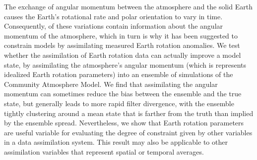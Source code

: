 The exchange of angular momentum between the atmosphere and the solid Earth causes the Earth's rotational rate and polar orientation to vary in time. 
Consequently, of these variations contain information about the angular momentum of the atmosphere, which in turn is why it has been suggested to constrain models by assimilating measured Earth rotation anomalies. 
We test whether the assimilation of Earth rotation data can actually improve a model state, by assimilating the atmosphere's angular momentum (which is represents idealized Earth rotation parameters) into an ensemble of simulations of the Community Atmosphere Model.
We find that assimilating the angular momentum can sometimes reduce the bias between the ensemble and the true state, but generally leads to more rapid filter divergence, with the ensemble tightly clustering around a mean state that is farther from the truth than implied by the ensemble spread. 
Nevertheless, we show that Earth rotation parameters are useful variable for evaluating the degree of constraint given by other variables in a data assimilation system.  
This result may also be applicable to other assimilation variables that represent spatial or temporal averages. 
